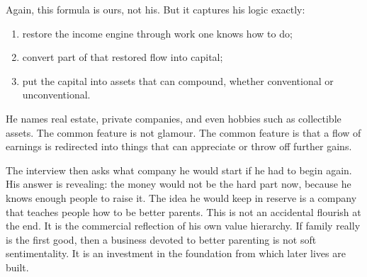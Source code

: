 Again, this formula is ours, not his. But it captures his logic exactly:
\begin{enumerate}
\item restore the income engine through work one knows how to do;
\item convert part of that restored flow into capital;
\item put the capital into assets that can compound, whether conventional or unconventional.
\end{enumerate}
He names real estate, private companies, and even hobbies such as collectible assets. The common feature is not glamour. The common feature is that a flow of earnings is redirected into things that can appreciate or throw off further gains.

\begin{figure}
\centering
{}
\end{figure}

The interview then asks what company he would start if he had to begin again. His answer is revealing: the money would not be the hard part now, because he knows enough people to raise it. The idea he would keep in reserve is a company that teaches people how to be better parents. This is not an accidental flourish at the end. It is the commercial reflection of his own value hierarchy. If family really is the first good, then a business devoted to better parenting is not soft sentimentality. It is an investment in the foundation from which later lives are built.

